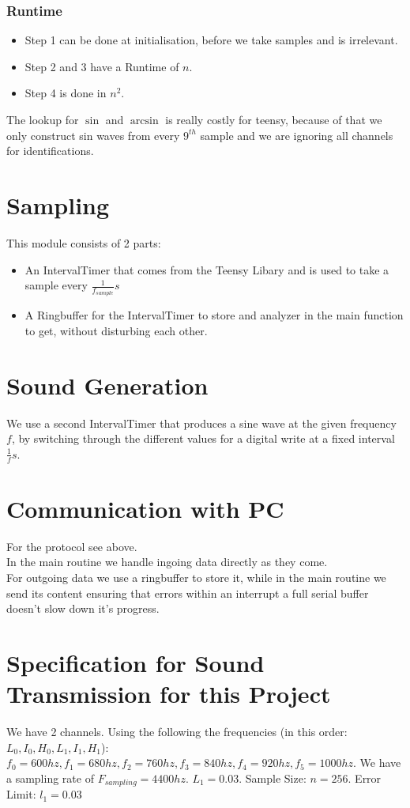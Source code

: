 \documentclass{book}
\begin{document}
\subsubsection{Runtime}
\begin{itemize}
\item Step 1 can be done at initialisation, before we take samples and is irrelevant.
\item Step 2 and 3 have a Runtime of $n$.
\item Step 4 is done in $n^2$.
\end{itemize}
The lookup for $\sin$ and $\arcsin$ is really costly for teensy, because of that we only construct sin waves from every $9^{th}$ sample and we are ignoring all channels for identifications.


\section{Sampling}
This module consists of 2 parts:
\begin{itemize}
\item An IntervalTimer that comes from the Teensy Libary and is used to take a sample every $\frac{1}{f_{sample}}s$
\item A Ringbuffer for the IntervalTimer to store and analyzer in the main function to get, without disturbing each other.
\end{itemize}

\section{Sound Generation}
We use a second IntervalTimer that produces a sine wave at the given frequency $f$, by switching through the different values for a digital write at a fixed interval $\frac{1}{f}s$.

\section{Communication with PC}
For the protocol see above.
\\In the main routine we handle ingoing data directly as they come.
\\For outgoing data we use a ringbuffer to store it, while in the main routine we send its content ensuring that errors within an interrupt a full serial buffer doesn't slow down it's progress.

\section{Specification for Sound Transmission for this Project}
We have 2 channels. Using the following the frequencies (in this order: $L_0, I_0, H_0, L_1, I_1, H_1$): $f_0=600hz, f_1=680hz, f_2=760hz, f_3=840hz, f_4=920hz, f_5=1000hz$. We have a sampling rate of $F_{sampling}=4400hz$. $L_1=0.03$. Sample Size: $n=256$. Error Limit: $l_1=0.03$
\end{document}
